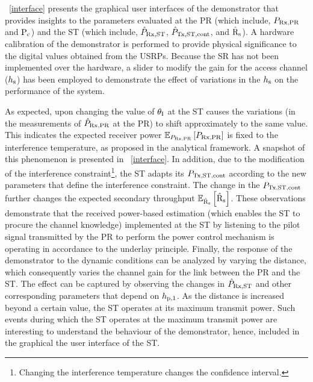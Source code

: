 \figurename~\ref{interface} presents the graphical user interfaces of the demonstrator that provides insights to the parameters evaluated at the PR (which include, $P_{\text{Rx,PR}}$ and $\text{P}_{\text{c}}$) and the ST (which include, $\hat{P}_{\text{Rx,ST}}$, $\hat{P}_{\text{Tx,ST,cont}}$, and $\hat{\text{{R}}}_{\text{s}}$). A hardware calibration of the demonstrator is performed to provide physical significance to the digital values obtained from the USRPs. Because the SR has not been implemented over the hardware, a slider to modify the gain for the access channel ($h_{\text{s}}$) has been employed to demonstrate the effect of variations in the $h_{\text{s}}$ on the performance of the system. %

As expected, upon changing the value of $\theta_{\text{I}}$ at the ST causes the variations (in the measurements of $\hat{P}_{\text{Rx,PR}}$ at the PR) to shift approximately to the same value. This indicates the expected receiver power ${\mathbb E}_{P_{\text{Rx,PR}}}\left[ P_{\text{Rx,PR}} \right]$ is fixed to the interference temperature, as proposed in the analytical framework. A snapshot of this phenomenon is presented in \figurename~\ref{interface}. In addition, due to the modification of the interference constraint\footnote{Changing the interference temperature changes the confidence interval.}, the ST adapts its $P_{\text{Tx,ST,cont}}$ according to the new parameters that define the interference constraint. The change in the $P_{\text{Tx,ST,cont}}$ further changes the expected secondary throughput ${\mathbb E}_{\hat{\text{{R}}}_{\text{s}}}\left[ \hat{\text{{R}}}_{\text{s}} \right]$. These observations demonstrate that the received power-based estimation (which enables the ST to procure the channel knowledge) implemented at the ST by listening to the pilot signal transmitted by the PR to perform the power control mechanism is operating in accordance to the underlay principle. Finally, the response of the demonstrator to the dynamic conditions can be analyzed by varying the distance, which consequently varies the channel gain for the link between the PR and the ST. The effect can be captured by observing the changes in $\hat{P}_{\text{Rx,ST}}$ and other corresponding parameters that depend on $h_{\text{p,1}}$. As the distance is increased beyond a certain value, the ST operates at its maximum transmit power. Such events during which the ST operates at the maximum transmit power are interesting to understand the behaviour of the demonstrator, hence, included in the graphical the user interface of the ST.


